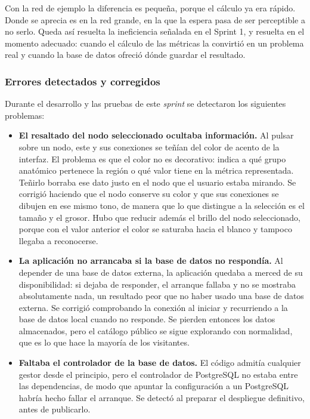 Con la red de ejemplo la diferencia es pequeña, porque el cálculo ya era rápido. Donde se aprecia es
en la red grande, en la que la espera pasa de ser perceptible a no serlo. Queda así resuelta la
ineficiencia señalada en el Sprint 1, y resuelta en el momento adecuado: cuando el cálculo de las
métricas la convirtió en un problema real y cuando la base de datos ofreció dónde guardar el
resultado.

\subsubsection*{Errores detectados y corregidos}

Durante el desarrollo y las pruebas de este \textit{sprint} se detectaron los siguientes problemas:

\begin{itemize}
	\item \textbf{El resaltado del nodo seleccionado ocultaba información.} Al pulsar sobre un nodo,
		este y sus conexiones se teñían del color de acento de la interfaz. El problema es que el
		color no es decorativo: indica a qué grupo anatómico pertenece la región o qué valor tiene en
		la métrica representada. Teñirlo borraba ese dato justo en el nodo que el usuario estaba
		mirando. Se corrigió haciendo que el nodo conserve su color y que sus conexiones se dibujen
		en ese mismo tono, de manera que lo que distingue a la selección es el tamaño y el grosor. Hubo
		que reducir además el brillo del nodo seleccionado, porque con el valor anterior el color se
		saturaba hacia el blanco y tampoco llegaba a reconocerse.
	\item \textbf{La aplicación no arrancaba si la base de datos no respondía.} Al depender de una
		base de datos externa, la aplicación quedaba a merced de su disponibilidad: si dejaba de
		responder, el arranque fallaba y no se mostraba absolutamente nada, un resultado peor que no
		haber usado una base de datos externa. Se corrigió comprobando la conexión al iniciar y
		recurriendo a la base de datos local cuando no responde. Se pierden entonces los datos
		almacenados, pero el catálogo público se sigue explorando con normalidad, que es lo que hace
		la mayoría de los visitantes.
	\item \textbf{Faltaba el controlador de la base de datos.} El código admitía cualquier gestor
		desde el principio, pero el controlador de PostgreSQL no estaba entre las dependencias, de
		modo que apuntar la configuración a un PostgreSQL habría hecho fallar el arranque. Se detectó
		al preparar el despliegue definitivo, antes de publicarlo.
\end{itemize}

